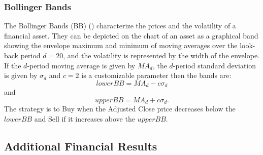 \documentclass[11pt, a4paper]{article}
\begin{document}
\subsubsection{Bollinger Bands}
The Bollinger Bands (BB) (\cite{bollinger2002bollinger}) characterize the prices and the volatility of a financial asset. They can be depicted on the chart of an asset as a graphical band showing the envelope maximum and minimum of moving averages over the look- back period $d=20$, and the volatility is represented by the width of the envelope.
If the $d$-period moving average is given by $MA_d$, the $d$-period standard deviation is given by $\sigma_d$ and $c=2$ is a customizable parameter then the bands are:
\begin{equation}
    \label{eq:BBlow}
    lowerBB = MA_d - c \sigma_d
\end{equation}
and
\begin{equation}
    \label{eq:BBup}
    upperBB = MA_d + c \sigma_d.
\end{equation}
The strategy is to Buy when the Adjusted Close price decreases below the $lowerBB$ and Sell if it increases above the $upperBB$.

\subsection{Additional Financial Results}
\end{document}
